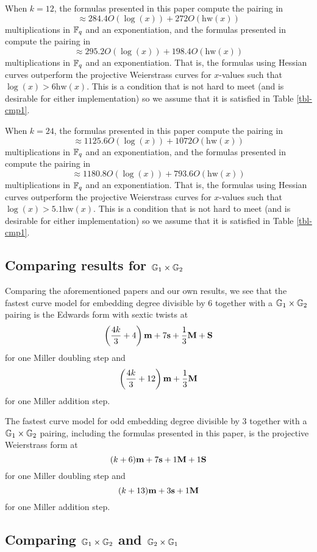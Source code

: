 When $k=12$, the formulas presented in this paper compute the pairing in
$$\approx 284.4 O(\log(x)) + 272 O(\text{hw}(x))$$
multiplications in $\mathbb{F}_{q}$ and an exponentiation,
and the formulas presented in \cite{2009/craig} compute the pairing in
$$\approx 295.2 O(\log(x)) + 198.4 O(\text{hw}(x))$$
multiplications in $\mathbb{F}_{q}$ and an exponentiation.
That is, the formulas using Hessian curves outperform the projective Weierstrass curves for $x$-values such that $\log(x) > 6\text{hw}(x)$.
This is a condition that is not hard to meet (and is desirable for either implementation) so we assume that it is satisfied in Table \ref{tbl-cmp1}.

When $k = 24$, the formulas presented in this paper compute the pairing in
$$\approx 1125.6 O(\log(x)) + 1072 O(\text{hw}(x))$$
multiplications in $\mathbb{F}_{q}$ and an exponentiation,
and the formulas presented in \cite{2009/craig} compute the pairing in
$$\approx 1180.8 O(\log(x)) + 793.6 O(\text{hw}(x))$$
multiplications in $\mathbb{F}_{q}$ and an exponentiation.
That is, the formulas using Hessian curves outperform the projective Weierstrass curves for $x$-values such that $\log(x) > 5.1\text{hw}(x)$.
This is a condition that is not hard to meet (and is desirable for either implementation) so we assume that it is satisfied in Table \ref{tbl-cmp1}.

\subsection{Comparing results for $\mathbb{G}_{1} \times \mathbb{G}_{2}$}

Comparing the aforementioned papers and our own results, we see that
the fastest curve model for embedding degree divisible by 6 together with a $\mathbb{G}_{1} \times \mathbb{G}_{2}$ pairing
is the Edwards form with sextic twists \cite{2014/LWZ}
at
$$\left(\frac{4k}{3}+ 4\right)\textbf{m} + 7\textbf{s}  + \frac{1}{3}\textbf{M} + \textbf{S}$$
for one Miller doubling step and
$$\left(\frac{4k}{3} + 12\right)\textbf{m}  + \frac{1}{3}\textbf{M}$$
for one Miller addition step.

The fastest curve model for odd embedding degree divisible by 3 together with a $\mathbb{G}_{1} \times \mathbb{G}_{2}$ pairing, including the formulas presented in this paper,
is the projective Weierstrass form \cite{2009/craig}
at
$$(k+6)\textbf{m} + 7\textbf{s} + 1\textbf{M} + 1\textbf{S}$$
for one Miller doubling step and
$$(k+13)\textbf{m} + 3\textbf{s} + 1\textbf{M}$$
for one Miller addition step.

\subsection{Comparing $\mathbb{G}_{1} \times \mathbb{G}_{2}$ and $\mathbb{G}_{2} \times \mathbb{G}_{1}$}

